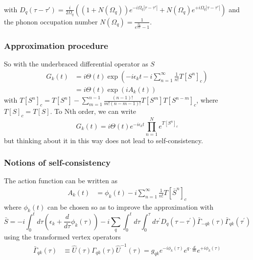 \begin{frame}
\begin{align}
\end{align}
with $D_q(\tau - \tau') = \frac{i}{2 \Omega_q} \left( (1 + N(\Omega_q)) e^{-i \Omega_q |\tau - \tau'|} + N(\Omega_q) e^{+i \Omega_q |\tau - \tau'|} \right)$
and the phonon occupation number $N(\Omega_q) = \frac{1}{e^{\frac{\Omega_q}{k T}} - 1}$.
\end{frame}

\begin{frame}
    \frametitle{Approximation procedure}
So with the underbraced differential operator as $S$
\begin{align}
G_k(t)&= i \Theta(t) \exp \left( -i \epsilon_k t - i \sum_{n=1}^{\infty} \frac{1}{n!} T\left[S^n\right]_c \right)\\
&= i \Theta(t) \exp \left( i A_k(t) \right) 
\end{align}
with $T\left[S^n\right]_c = T\left[S^n\right]-\sum_{m=1}^{n-1} \frac{(n-1)!}{m!(n-m-1)!} T\left[S^{m}\right] T\left[S^{n-m}\right]_c$, where $T[S]_c=T[S]$. To Nth order, we can write
\begin{equation}
G_k(t) = i \Theta(t) e^{-i \epsilon_k t} \prod_{n=1}^N e^{T\left[S^n\right]_c}
\end{equation}
but thinking about it in this way does not lead to self-consistency.

\end{frame}

\begin{frame}
    \frametitle{Notions of self-consistency}
The action function can be written as
\begin{align}
    A_k(t) 
&= \phi_k(t) - i \sum_{n=1}^{\infty} \frac{1}{n!} T\left[\bar{S}^n\right]_c
\end{align}
where $\phi_k(t)$ can be chosen so as to improve the approximation with 
\begin{equation}
    \bar{S} = -i \int_0^t d \tau\left(\epsilon_k+\frac{d}{d \tau} \phi_k(\tau)\right) -i \sum_q \int_0^t d \tau \int_0^\tau d \tau^{\prime} D_q\left(\tau-\tau^{\prime}\right) \bar{\Gamma}_{-q k}(\tau) \bar{\Gamma}_{q k}\left(\tau^{\prime}\right)
\end{equation}
 using the transformed vertex operators
\begin{align}
    \bar{\Gamma}_{q k}(\tau)&\equiv  \hat{U}(\tau)\Gamma_{q k}(\tau)\hat{U}^{-1}(\tau)=g_{q k} e^{-i \phi_k(\tau)} e^{q \cdot \frac{d}{d k}} e^{+i \phi_k(\tau)}
\end{align}
 

\end{frame}

